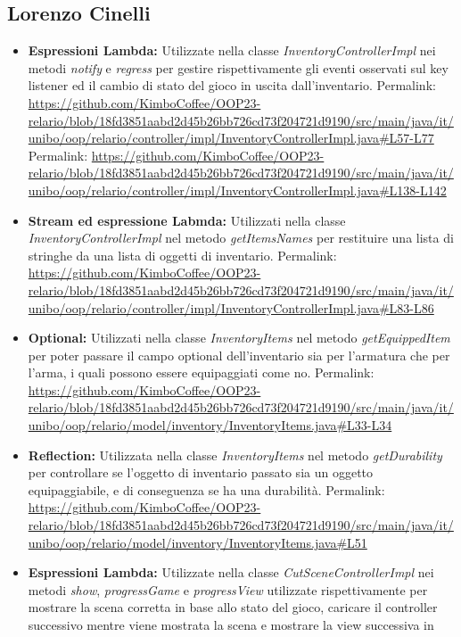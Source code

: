 \documentclass[a4paper,12pt]{report}
\begin{document}
\subsection{Lorenzo Cinelli}

\begin{itemize}
	\item \textbf{Espressioni Lambda:} Utilizzate nella classe \textit{InventoryControllerImpl} nei metodi \textit{notify} e \textit{regress} per gestire rispettivamente
	gli eventi osservati sul key listener ed il cambio di stato del gioco in uscita dall'inventario.
	Permalink: \url{https://github.com/KimboCoffee/OOP23-relario/blob/18fd3851aabd2d45b26bb726cd73f204721d9190/src/main/java/it/unibo/oop/relario/controller/impl/InventoryControllerImpl.java#L57-L77}
	Permalink: \url{https://github.com/KimboCoffee/OOP23-relario/blob/18fd3851aabd2d45b26bb726cd73f204721d9190/src/main/java/it/unibo/oop/relario/controller/impl/InventoryControllerImpl.java#L138-L142}
	\item \textbf{Stream ed espressione Labmda:} Utilizzati nella classe \textit{InventoryControllerImpl} nel metodo \textit{getItemsNames} per restituire una lista di stringhe
	da una lista di oggetti di inventario.
	Permalink: \url{https://github.com/KimboCoffee/OOP23-relario/blob/18fd3851aabd2d45b26bb726cd73f204721d9190/src/main/java/it/unibo/oop/relario/controller/impl/InventoryControllerImpl.java#L83-L86}
	\item \textbf{Optional:} Utilizzati nella classe \textit{InventoryItems} nel metodo \textit{getEquippedItem} per poter passare il campo optional dell'inventario sia per l'armatura
	che per l'arma, i quali possono essere equipaggiati come no.
	Permalink: \url{https://github.com/KimboCoffee/OOP23-relario/blob/18fd3851aabd2d45b26bb726cd73f204721d9190/src/main/java/it/unibo/oop/relario/model/inventory/InventoryItems.java#L33-L34}
	\item \textbf{Reflection:} Utilizzata nella classe \textit{InventoryItems} nel metodo \textit{getDurability} per controllare se l'oggetto di inventario passato sia un oggetto
	equipaggiabile, e di conseguenza se ha una durabilità.
	Permalink: \url{https://github.com/KimboCoffee/OOP23-relario/blob/18fd3851aabd2d45b26bb726cd73f204721d9190/src/main/java/it/unibo/oop/relario/model/inventory/InventoryItems.java#L51}
	\item \textbf{Espressioni Lambda:} Utilizzate nella classe \textit{CutSceneControllerImpl} nei metodi \textit{show}, \textit{progressGame} e \textit{progressView} utilizzate
	rispettivamente per mostrare la scena corretta in base allo stato del gioco, caricare il controller successivo mentre viene mostrata la scena e mostrare la view successiva in

\end{itemize}
\end{document}
